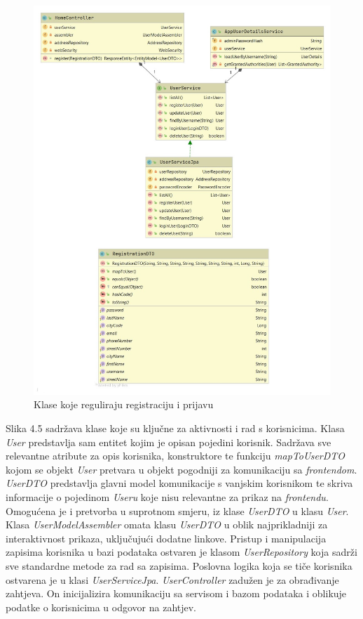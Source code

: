 				
				\begin{figure}[H]
					\includegraphics[scale=0.45]{slike/cs4.jpg} %
					\centering
					\caption{Klase koje reguliraju registraciju i prijavu}
					
				\end{figure}
			
				\newpage
				
				Slika 4.5 sadržava klase koje su ključne za aktivnosti i rad s korisnicima.
				Klasa \textit{User} predstavlja sam entitet kojim je opisan pojedini korisnik. Sadržava sve relevantne atribute za opis korisnika, konstruktore te funkciju \textit{mapToUserDTO} kojom se objekt \textit{User} pretvara u objekt pogodniji za komunikaciju sa \textit{frontendom}. \textit{UserDTO} predstavlja glavni model komunikacije s vanjskim korisnikom te skriva informacije o pojedinom \textit{Useru} koje nisu relevantne za prikaz na \textit{frontendu}.
				Omogućena je i pretvorba u suprotnom smjeru, iz klase \textit{UserDTO} u klasu \textit{User}. Klasa \textit{UserModelAssembler} omata klasu \textit{UserDTO} u oblik najprikladniji za interaktivnost prikaza, uključujući dodatne linkove. 
				Pristup i manipulacija zapisima korisnika u bazi podataka ostvaren je klasom \textit{UserRepository} koja sadrži sve standardne metode za rad sa zapisima.
				Poslovna logika koja se tiče korisnika ostvarena je u klasi \textit{UserServiceJpa}.
				\textit{UserController} zadužen je za obrađivanje zahtjeva. On inicijalizira komunikaciju sa servisom i bazom podataka i oblikuje podatke o korisnicima u odgovor na zahtjev.
				

